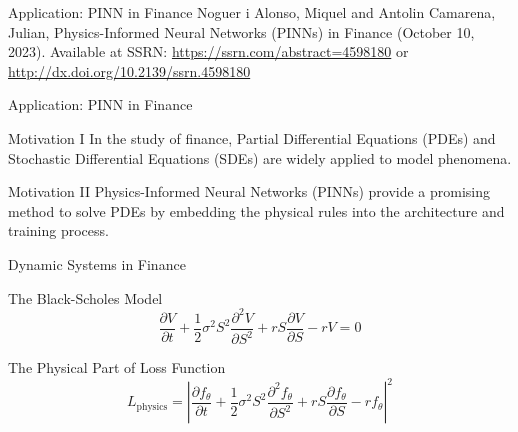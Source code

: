 \begin{frame}{Application: PINN in Finance}
    Noguer i Alonso, Miquel and Antolin Camarena, Julian, Physics-Informed Neural Networks (PINNs) in Finance (October 10, 2023). Available at SSRN: \url{https://ssrn.com/abstract=4598180} or \url{http://dx.doi.org/10.2139/ssrn.4598180}
\end{frame}

\begin{frame}{Application: PINN in Finance}
    \begin{block}{Motivation I}
        In the study of finance, Partial Differential Equations (PDEs) and Stochastic Differential Equations (SDEs) are widely applied to model phenomena.  
    \end{block}

    \begin{block}{Motivation II}
        Physics-Informed Neural Networks (PINNs) provide a promising method to solve PDEs by embedding the physical rules into the architecture and training process. 
    \end{block}
\end{frame}

\begin{frame}{Dynamic Systems in Finance}
    \begin{block}{The Black-Scholes Model}
        \begin{equation}
            \frac{\partial V}{\partial t} + \frac{1}{2} \sigma^2 S^2 \frac{\partial^2 V}{\partial S^2} + r S \frac{\partial V}{\partial S} - r V = 0
        \end{equation}
    \end{block}

    \begin{block}{The Physical Part of Loss Function}
        \begin{equation}
            L_{\text{physics}} = \left| \frac{\partial f_{\theta}}{\partial t} + \frac{1}{2} \sigma^2 S^2 \frac{\partial^2 f_{\theta}}{\partial S^2} + r S \frac{\partial f_{\theta}}{\partial S} - r f_{\theta} \right|^2
        \end{equation}
    \end{block}
\end{frame}

